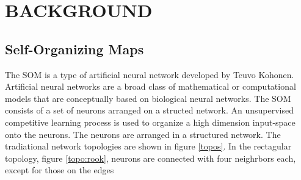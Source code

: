\chapter{BACKGROUND}


\section{Self-Organizing Maps}
\label{bg:som}
The SOM is a type of artificial neural network developed by Teuvo Kohonen.
Artificial neural networks are a broad class of mathematical or computational models that are conceptually based on biological neural networks.
The SOM consists of a set of neurons arranged on a structed network.
An unsupervised competitive learning process is used to organize a high dimension input-space onto the neurons.
The neurons are arranged in a structured network.  The tradiational network
topologies are shown in figure \ref{topos}.  In the rectagular topology,
figure \ref{topo:rook}, neurons are connected with four neighrbors each,
except for those on the edges

